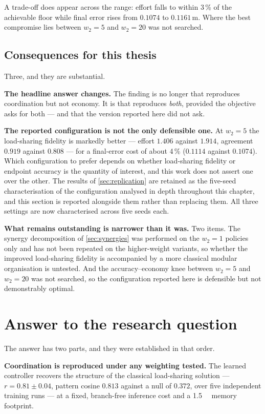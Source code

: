 A trade-off does appear across the range: effort falls to within 3\,\% of the
achievable floor while final error rises from $0.1074$ to
$0.1161$\,m. Where the best compromise lies between $w_2 = 5$ and
$w_2 = 20$ was not searched.

\subsection{Consequences for this thesis}

Three, and they are substantial.

\textbf{The headline answer changes.} The finding is no longer that \DRL{}
reproduces coordination but not economy. It is that \DRL{} reproduces
\emph{both}, provided the objective asks for both --- and that the version
reported here did not ask.

\textbf{The reported configuration is not the only defensible one.} At
$w_2 = 5$ the load-sharing fidelity is markedly better --- effort $1.406$ against
$1.914$, agreement $0.919$ against $0.808$ --- for a final-error cost of about
4\,\% ($0.1114$ against $0.1074$). Which configuration to prefer depends on
whether load-sharing fidelity or endpoint accuracy is the quantity of interest,
and this work does not assert one over the other. The results of \cref{sec:replication} are retained as the five-seed
characterisation of the configuration analysed in depth throughout this chapter,
and this section is reported alongside them rather than replacing them. All three
settings are now characterised across five seeds each.

\textbf{What remains outstanding is narrower than it was.} Two items. The synergy
decomposition of \cref{sec:synergies} was performed on the $w_2 = 1$ policies
only and has not been repeated on the higher-weight variants, so whether the
improved load-sharing fidelity is accompanied by a more classical modular
organisation is untested. And the accuracy--economy knee between $w_2 = 5$ and
$w_2 = 20$ was not searched, so the configuration reported here is defensible but
not demonstrably optimal.

\section{Answer to the research question}

The answer has two parts, and they were established in that order.

\textbf{Coordination is reproduced under any weighting tested.} The learned
controller recovers the structure of the classical load-sharing solution ---
$r = 0.81 \pm 0.04$, pattern cosine $0.813$ against a null of $0.372$, over five
independent training runs --- at a fixed, branch-free inference cost and a
\SI{1.5}{\mega\byte} memory footprint.

